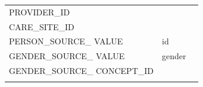 \documentclass[10.5pt]{book}
\theoremstyle{definition}
\theoremstyle{definition}
\theoremstyle{definition}
\theoremstyle{remark}
\begin{document}
\begin{longtable}[]{@{}lll@{}}
\begin{minipage}[t]{0.28\columnwidth}\raggedright\strut
PROVIDER\_ID\strut
\end{minipage} & \begin{minipage}[t]{0.13\columnwidth}\raggedright\strut
\strut
\end{minipage} & \begin{minipage}[t]{0.50\columnwidth}\raggedright\strut
\strut
\end{minipage}\tabularnewline
\begin{minipage}[t]{0.28\columnwidth}\raggedright\strut
CARE\_SITE\_ID\strut
\end{minipage} & \begin{minipage}[t]{0.13\columnwidth}\raggedright\strut
\strut
\end{minipage} & \begin{minipage}[t]{0.50\columnwidth}\raggedright\strut
\strut
\end{minipage}\tabularnewline
\begin{minipage}[t]{0.28\columnwidth}\raggedright\strut
PERSON\_SOURCE\_ VALUE\strut
\end{minipage} & \begin{minipage}[t]{0.13\columnwidth}\raggedright\strut
id\strut
\end{minipage} & \begin{minipage}[t]{0.50\columnwidth}\raggedright\strut
\strut
\end{minipage}\tabularnewline
\begin{minipage}[t]{0.28\columnwidth}\raggedright\strut
GENDER\_SOURCE\_ VALUE\strut
\end{minipage} & \begin{minipage}[t]{0.13\columnwidth}\raggedright\strut
gender\strut
\end{minipage} & \begin{minipage}[t]{0.50\columnwidth}\raggedright\strut
\strut
\end{minipage}\tabularnewline
\begin{minipage}[t]{0.28\columnwidth}\raggedright\strut
GENDER\_SOURCE\_ CONCEPT\_ID\strut
\end{minipage} & \begin{minipage}[t]{0.13\columnwidth}\raggedright\strut
\strut
\end{minipage} & \begin{minipage}[t]{0.50\columnwidth}\raggedright\strut
\strut
\end{minipage}\tabularnewline
\begin{minipage}[t]{0.28\columnwidth}\raggedright\strut

\end{minipage}
\end{longtable}
\end{document}
